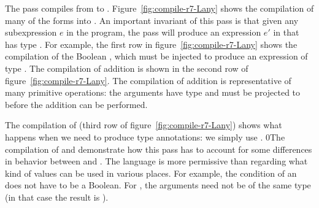 \documentclass[7x10]{TimesAPriori_MIT}%
\def\racketEd{0}
\def\edition{1}
\newcommand{\racket}[1]{{\if\edition\racketEd{#1}\fi}}
\numberwithin{theorem}{chapter}
\numberwithin{definition}{chapter}
\numberwithin{equation}{chapter}
\begin{document}
The  pass compiles from \LangDyn{} to \LangAny{}.
Figure~\ref{fig:compile-r7-Lany} shows the compilation of many of the
\LangDyn{} forms into \LangAny{}. An important invariant of this pass
is that given any subexpression $e$ in the \LangDyn{} program, the
pass will produce an expression $e'$ in \LangAny{} that has type
\ANYTY{}. For example, the first row in
figure~\ref{fig:compile-r7-Lany} shows the compilation of the Boolean
\TRUE{}, which must be injected to produce an expression of type
\ANYTY{}.
%
The compilation of addition is shown in the second row of
figure~\ref{fig:compile-r7-Lany}. The compilation of addition is
representative of many primitive operations: the arguments have type
\ANYTY{} and must be projected to \INTTYPE{} before the addition can
be performed.

The compilation of  (third row of
figure~\ref{fig:compile-r7-Lany}) shows what happens when we need to
produce type annotations: we simply use \ANYTY{}.
%
\racket{The compilation of  and   demonstrate how
  this pass has to account for some differences in behavior between
  \LangDyn{} and \LangAny{}. The \LangDyn{} language is more
  permissive than \LangAny{} regarding what kind of values can be used
  in various places. For example, the condition of an \key{if} does
  not have to be a Boolean. For \key{eq?}, the arguments need not be
  of the same type (in that case the result is \code{\#f}).}
\end{document}
